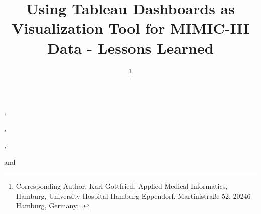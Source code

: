 \documentclass[aac,crcready]{iosart2x}
\begin{document}
\begin{frontmatter}

{\centering \title{Using Tableau Dashboards as Visualization Tool for MIMIC-III Data - Lessons Learned
}}


\author[A]{ %
\thanks{Corresponding Author, Karl Gottfried, Applied Medical Informatics, Hamburg, University Hospital Hamburg-Eppendorf, Martinistraße 52, 20246 Hamburg, Germany;  .}},
\author[A]{ },
\author[A]{ },
\author[A]{ }
and
\author[A]{ }
\address[A]{Applied Medical Informatics, , Germany, ,
}



\end{frontmatter}
\end{document}

